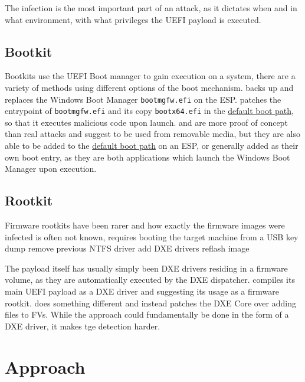 The infection is the most important part of an attack, as it dictates when and in what environment, with what privileges the \ac{UEFI} payload is executed.

\subsection{Bootkit}

Bootkits use the \ac{UEFI} Boot manager to gain execution on a system, there are a variety of methods using different options of the boot mechanism.
\cite{finspy} backs up and replaces the Windows Boot Manager \lstinline{bootmgfw.efi} on the \ac{ESP}.
\cite{especter} patches the entrypoint of \lstinline{bootmgfw.efi} and its copy \lstinline{bootx64.efi} in the \hyperref[sec:uefi-pi:uefi:boot-manager]{default boot path}, so that it executes malicious code upon launch.
\cite{dreamboot} and\cite{efiguard} are more proof of concept than real attacks and suggest to be used from removable media, but they are also able to be added to the \hyperref[sec:uefi-pi:uefi:boot-manager]{default boot path} on an \ac{ESP}, or generally added as their own boot entry\cite{efiguard}, as they are both applications which launch the Windows Boot Manager upon execution.
\subsection{Rootkit}


Firmware rootkits have been rarer and how exactly the firmware images were infected is often not known,
\cite{vector-edk} requires booting the target machine from a USB key\cite{mosaicregressor}
\cite{lojax}
dump
remove previous NTFS driver
add DXE drivers
reflash image

The payload itself has usually simply been \ac{DXE} drivers residing in a firmware volume\cite{mosaicregressor,lojax}, as they are automatically executed by the \ac{DXE} dispatcher.\cite{efiguard} compiles its main \ac{UEFI} payload as a \ac{DXE} driver and suggesting its usage as a firmware rootkit.\cite{moonbounce} does something different and instead patches the \ac{DXE} Core over adding files to \acp{FV}. While the approach could fundamentally be done in the form of a \ac{DXE} driver, it makes tge detection harder\cite{moonbounce}.

\section{Approach}

